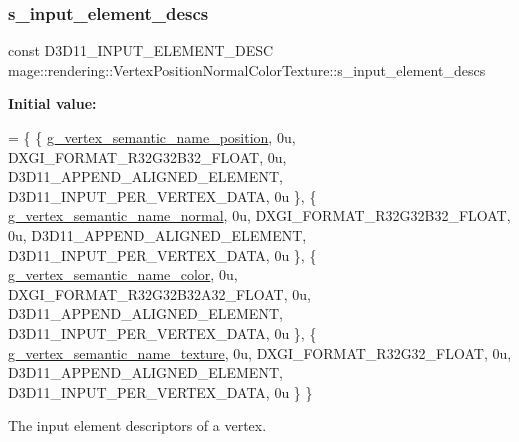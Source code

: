 \subsubsection{\texorpdfstring{s\+\_\+input\+\_\+element\+\_\+descs}{s\_input\_element\_descs}}
{\footnotesize\ttfamily const D3\+D11\+\_\+\+I\+N\+P\+U\+T\+\_\+\+E\+L\+E\+M\+E\+N\+T\+\_\+\+D\+E\+SC mage\+::rendering\+::\+Vertex\+Position\+Normal\+Color\+Texture\+::s\+\_\+input\+\_\+element\+\_\+descs\hspace{0.3cm}{\ttfamily [static]}}

{\bfseries Initial value\+:}
\begin{DoxyCode}
= \{
        \{ \mbox{\hyperlink{namespacemage_1_1rendering_1_1anonymous__namespace_02vertex_8cpp_03_a6e875b92e4de38b14e8dc404df41a5ad}{g\_vertex\_semantic\_name\_position}}, 0u, DXGI\_FORMAT\_R32G32B32\_FLOAT, 
         0u, D3D11\_APPEND\_ALIGNED\_ELEMENT, D3D11\_INPUT\_PER\_VERTEX\_DATA, 0u \},
        \{ \mbox{\hyperlink{namespacemage_1_1rendering_1_1anonymous__namespace_02vertex_8cpp_03_a1b4bf08af207f8c1681ecf617b094ef3}{g\_vertex\_semantic\_name\_normal}},   0u, DXGI\_FORMAT\_R32G32B32\_FLOAT,   
       0u, D3D11\_APPEND\_ALIGNED\_ELEMENT, D3D11\_INPUT\_PER\_VERTEX\_DATA, 0u \},
        \{ \mbox{\hyperlink{namespacemage_1_1rendering_1_1anonymous__namespace_02vertex_8cpp_03_aae8cd813faec1e62d4e6463db8c99ab5}{g\_vertex\_semantic\_name\_color}},    0u, DXGI\_FORMAT\_R32G32B32A32\_FLOAT, 
      0u, D3D11\_APPEND\_ALIGNED\_ELEMENT, D3D11\_INPUT\_PER\_VERTEX\_DATA, 0u \},
        \{ \mbox{\hyperlink{namespacemage_1_1rendering_1_1anonymous__namespace_02vertex_8cpp_03_a76de570f9dcc80db1e8e2f0a19536085}{g\_vertex\_semantic\_name\_texture}},  0u, DXGI\_FORMAT\_R32G32\_FLOAT,     
        0u, D3D11\_APPEND\_ALIGNED\_ELEMENT, D3D11\_INPUT\_PER\_VERTEX\_DATA, 0u \}
    \}
\end{DoxyCode}
The input element descriptors of a vertex. 